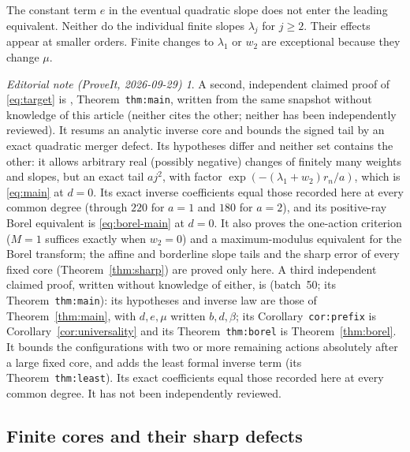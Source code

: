 \documentclass[11pt,a4paper]{article}
\numberwithin{equation}{section}
\theoremstyle{definition}
\theoremstyle{remark}
\newtheorem*{ednote}{Editorial note (ProveIt, 2026-09-29)}
\begin{document}
The constant term $e$ in the eventual quadratic slope does not enter the
leading equivalent. Neither do the individual finite slopes $\lambda_j$
for $j\ge2$. Their effects appear at smaller orders. Finite changes to
$\lambda_1$ or $w_2$ are exceptional because they change $\mu$.

\begin{ednote}
A second, independent claimed proof of \eqref{eq:target} is
\cite{ed:sqf}, Theorem~\texttt{thm:main}, written from the same snapshot
without knowledge of this article (neither cites the other; neither
has been independently reviewed). It resums an analytic inverse core and
bounds the signed tail by an exact quadratic merger defect. Its hypotheses
differ and neither set contains the other: it allows arbitrary real
(possibly negative) changes of finitely many weights and slopes, but an
exact tail $aj^2$, with factor $\exp(-(\lambda_1+w_2)r_n/a)$, which is
\eqref{eq:main} at $d=0$. Its exact inverse coefficients equal those
recorded here at every common degree (through $220$ for $a=1$ and $180$
for $a=2$), and its positive-ray Borel equivalent is
\eqref{eq:borel-main} at $d=0$. It also proves the one-action criterion
($M=1$ suffices exactly when $w_2=0$) and a maximum-modulus equivalent for
the Borel transform; the affine and borderline slope tails and the sharp
error of every fixed core (Theorem~\ref{thm:sharp}) are proved only here.
A third independent claimed proof, written without knowledge of either, is
 (batch~50; its
Theorem~\texttt{thm:main}): its hypotheses and inverse law are those of
Theorem~\ref{thm:main}, with $d,e,\mu$ written $b,d,\beta$; its
Corollary~\texttt{cor:prefix} is Corollary~\ref{cor:universality} and its
Theorem~\texttt{thm:borel} is Theorem~\ref{thm:borel}. It bounds the
configurations with two or more remaining actions absolutely after a large
fixed core, and adds the least formal inverse term (its
Theorem~\texttt{thm:least}). Its exact coefficients equal those recorded
here at every common degree. It has not been independently reviewed.
\end{ednote}

\subsection{Finite cores and their sharp defects}
\end{document}
